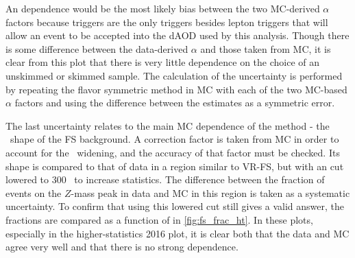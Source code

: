 An \met dependence would be the most likely bias between the two \ac{MC}-derived $\alpha$ factors because \met triggers are the only triggers besides lepton triggers that will allow an event to be accepted into the \ac{dAOD} used by this analysis. Though there is some difference between the data-derived $\alpha$ and those taken from \ac{MC}, it is clear from this plot that there is very little dependence on the choice of an unskimmed or skimmed sample. The calculation of the uncertainty is performed by repeating the flavor symmetric method in \ac{MC} with each of the two \ac{MC}-based $\alpha$ factors and using the difference between the estimates as a symmetric error.

The last uncertainty relates to the main \ac{MC} dependence of the method - the \mll~shape of the \ac{FS} background. A correction factor is taken from \ac{MC} in order to account for the \mll~widening, and the accuracy of that factor must be checked. Its shape is compared to that of data in a region similar to VR-FS, but with an \HT cut lowered to 300 \gev~to increase statistics. The difference between the fraction of events on the $Z$-mass peak in data and \ac{MC} in this region is taken as a systematic uncertainty. To confirm that using this lowered \HT cut still gives a valid answer, the fractions are compared as a function of \HT in \autoref{fig:fs_frac_ht}. In these plots, especially in the higher-statistics 2016 plot, it is clear both that the data and \ac{MC} agree very well and that there is no strong \HT dependence. 

